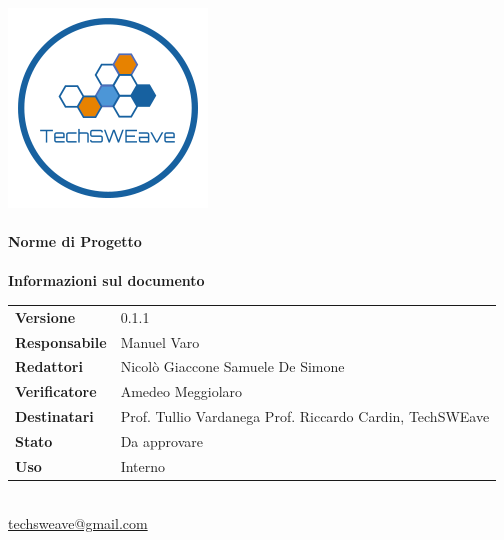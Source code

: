 \documentclass[a4paper]{article}
\begin{document}
\begin{titlepage}
    \begin{center}
        \includegraphics{../../../Images/logo}\\
        \vspace{20px}
        \textcolor{logo}{\hrulefill}\\
        \vspace{20px}
        \textbf{\huge\textcolor{logo}{Norme di Progetto}}\\
        \vspace{10px}
        \textcolor{logo}{\hrulefill}\\
        \vspace{40px}
        \textbf{\Large Informazioni sul documento}\\
        \vspace{20px}
        \begin{tabular}{p{100px} | p{100px}}
            \textbf{Versione}     & 0.1.1                                                                      \\
            \textbf{Responsabile} & Manuel Varo                                                                \\
            \textbf{Redattori}    & Nicolò Giaccone \newline Samuele De Simone                                 \\
            \textbf{Verificatore} & Amedeo Meggiolaro                                                          \\
            \textbf{Destinatari}  & Prof. Tullio Vardanega \newline Prof. Riccardo Cardin, \newline TechSWEave \\
            \textbf{Stato}        & Da approvare                                                               \\
            \textbf{Uso}          & Interno                                                                    \\
        \end{tabular}\\
        \vspace{60px}
        \href{mailto:techsweave@gmail.com}{techsweave@gmail.com}\\
    \end{center}
\end{titlepage}
\end{document}
